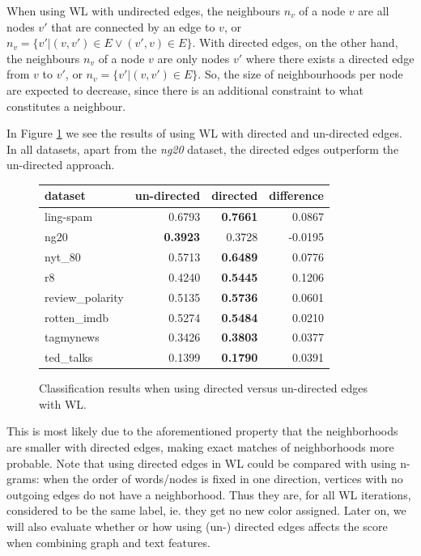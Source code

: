 When using WL with undirected edges, the neighbours $n_v$ of a node $v$ are all nodes $v'$ that are connected by an edge to $v$, or $n_v = \{v' | (v, v') \in E \lor (v', v ) \in E \}$.
With directed edges, on the other hand, the neighbours $n_v$ of a node $v$ are only nodes $v'$ where there exists a directed edge from $v$ to $v'$, or $n_v = \{v' | (v, v') \in E \}$.
So, the size of neighbourhoods per node are expected to decrease, since there is an additional constraint to what constitutes a neighbour.

In Figure \ref{fig:results_directed_vs_undirected} we see the results of using WL with directed and un-directed edges.
In all datasets, apart from the \textit{ng20} dataset, the directed edges outperform the un-directed approach.

\begin{figure}[htb!]
	\centering
\begin{tabular}{lrrr}
	dataset &  un-directed & directed &  difference \\
	\midrule
	ling-spam       &  0.6793 &  \textbf{0.7661} &  0.0867 \\
	ng20            &  \textbf{0.3923} &  0.3728 & -0.0195 \\
	nyt\_80          &  0.5713 &  \textbf{0.6489} &  0.0776 \\
	r8              &  0.4240 &  \textbf{0.5445} &  0.1206 \\
	review\_polarity &  0.5135 & \textbf{ 0.5736 }&  0.0601 \\
	rotten\_imdb     &  0.5274 &  \textbf{0.5484} &  0.0210 \\
	tagmynews       &  0.3426 &  \textbf{0.3803} &  0.0377 \\
	ted\_talks       &  0.1399 &  \textbf{0.1790} &  0.0391 \\
	\bottomrule
\end{tabular}
\caption{Classification results when using directed versus un-directed edges with WL.}\label{fig:results_directed_vs_undirected}
\end{figure}

This is most likely due to the aforementioned property that the neighborhoods are smaller with directed edges, making exact matches of neighborhoods more probable.
Note that using directed edges in WL could be compared with using n-grams: when the order of words/nodes is fixed in one direction, vertices with no outgoing edges do not have a neighborhood. Thus they are, for all WL iterations, considered to be the same label, ie. they get no new color assigned.
Later on, we will also evaluate whether or how using (un-) directed edges affects the score when combining graph and text features.

